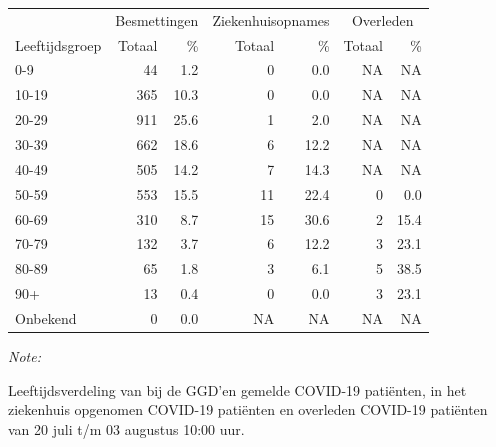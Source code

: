 \documentclass[
  english,
  man,floatsintext]{apa6}
\begin{document}
\begin{table}[H]
\centering\begingroup\fontsize{11}{13}\selectfont

\begin{threeparttable}
\begin{tabular}{lrrrrrr}
\toprule
\multicolumn{1}{c}{ } & \multicolumn{2}{c}{Besmettingen} & \multicolumn{2}{c}{Ziekenhuisopnames} & \multicolumn{2}{c}{Overleden} \\
\cmidrule(l{3pt}r{3pt}){2-3} \cmidrule(l{3pt}r{3pt}){4-5} \cmidrule(l{3pt}r{3pt}){6-7}
Leeftijdsgroep & Totaal & \% & Totaal & \% & Totaal & \%\\
\midrule
0-9 & 44 & 1.2 & 0 & 0.0 & NA & NA\\
10-19 & 365 & 10.3 & 0 & 0.0 & NA & NA\\
20-29 & 911 & 25.6 & 1 & 2.0 & NA & NA\\
30-39 & 662 & 18.6 & 6 & 12.2 & NA & NA\\
40-49 & 505 & 14.2 & 7 & 14.3 & NA & NA\\
50-59 & 553 & 15.5 & 11 & 22.4 & 0 & 0.0\\
60-69 & 310 & 8.7 & 15 & 30.6 & 2 & 15.4\\
70-79 & 132 & 3.7 & 6 & 12.2 & 3 & 23.1\\
80-89 & 65 & 1.8 & 3 & 6.1 & 5 & 38.5\\
90+ & 13 & 0.4 & 0 & 0.0 & 3 & 23.1\\
Onbekend & 0 & 0.0 & NA & NA & NA & NA\\
\bottomrule
\end{tabular}
\begin{tablenotes}
\item \textit{Note: } 
\item Leeftijdsverdeling van bij de GGD’en gemelde COVID-19 patiënten, in het ziekenhuis opgenomen COVID-19 patiënten en overleden COVID-19 patiënten van 20 juli t/m 03 augustus 10:00 uur.
\end{tablenotes}
\end{threeparttable}
\endgroup{}
\end{table}
\end{document}
